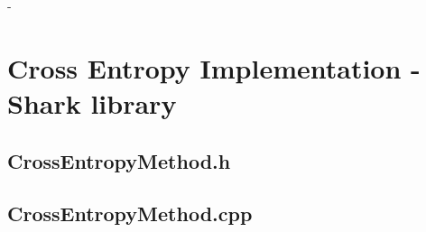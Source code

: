 \clearpage


%



 - 

\clearpage

\section{Cross Entropy Implementation - Shark library \label{app:crossEntropyCode}}

\subsection{CrossEntropyMethod.h}



\clearpage

\subsection{CrossEntropyMethod.cpp}


